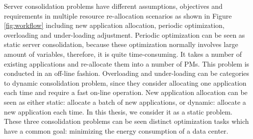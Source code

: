 Server consolidation problems have different assumptions, objectives and requirements in multiple resource re-allocation scenarios as shown in Figure \ref{fig:workflow} including new application allocation, periodic optimization, overloading and under-loading adjustment.
Periodic optimization can be seen as static server consolidation, because these optimization normally involves large amount of variables, therefore, it is quite time-consuming. It takes a number of existing applications and re-allocate them into a number of PMs. This problem is conducted in an off-line fashion. Overloading and under-loading can be categories to dynamic consolidation problem, since they consider allocating one application each time and require a fast on-line operation. New application allocation can be seen as either static: allocate a batch of new applications, or dynamic: allocate a new application each time. In this thesis, we consider it as a static problem. These three consolidation problems can be seen distinct optimization tasks which have a common goal: minimizing the energy consumption of a data center. 









